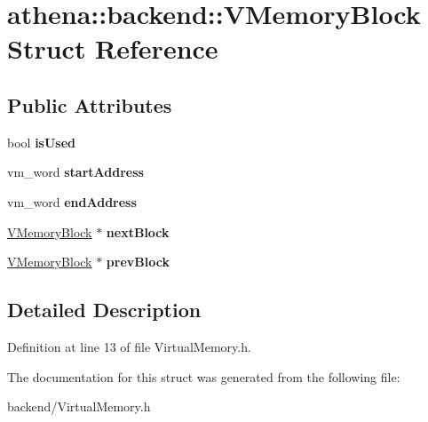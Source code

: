 \hypertarget{structathena_1_1backend_1_1_v_memory_block}{}\section{athena\+:\+:backend\+:\+:V\+Memory\+Block Struct Reference}
\label{structathena_1_1backend_1_1_v_memory_block}
\subsection*{Public Attributes}
\begin{DoxyCompactItemize}
\item 
\mbox{\label{structathena_1_1backend_1_1_v_memory_block_a54350a136efca373277b4d91a09c15cf}} 
bool {\bfseries is\+Used}
\item 
\mbox{\label{structathena_1_1backend_1_1_v_memory_block_ae7999c6fd515f8150185b23a52e410a8}} 
vm\+\_\+word {\bfseries start\+Address}
\item 
\mbox{\label{structathena_1_1backend_1_1_v_memory_block_a2585be4f90d28d5d0838934f3569ea00}} 
vm\+\_\+word {\bfseries end\+Address}
\item 
\mbox{\label{structathena_1_1backend_1_1_v_memory_block_a2bf211c6220136d1f9d38c86043ae2c6}} 
\mbox{\hyperlink{structathena_1_1backend_1_1_v_memory_block}{V\+Memory\+Block}} $\ast$ {\bfseries next\+Block}
\item 
\mbox{\label{structathena_1_1backend_1_1_v_memory_block_a9827bc62cfcb085a80d236311b7e1e2c}} 
\mbox{\hyperlink{structathena_1_1backend_1_1_v_memory_block}{V\+Memory\+Block}} $\ast$ {\bfseries prev\+Block}
\end{DoxyCompactItemize}


\subsection{Detailed Description}


Definition at line 13 of file Virtual\+Memory.\+h.



The documentation for this struct was generated from the following file\+:\begin{DoxyCompactItemize}
\item 
backend/Virtual\+Memory.\+h\end{DoxyCompactItemize}
